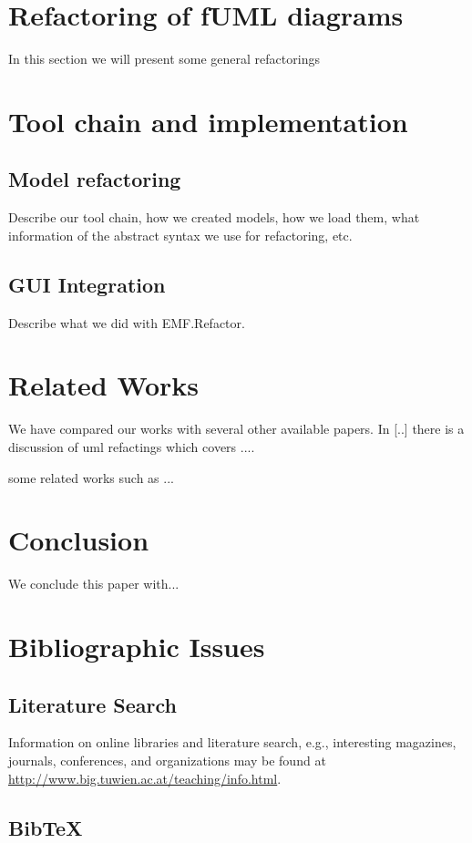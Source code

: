 \documentclass{llncs}
\begin{document}
\section{Refactoring of fUML diagrams}
In this section we will present some general refactorings

\section{Tool chain and implementation}

\subsection{Model refactoring}
Describe our tool chain, how we created models, how we load them, what information of the abstract syntax we use for refactoring, etc.

\subsection{GUI Integration}
Describe what we did with EMF.Refactor.

\section{Related Works}
We have compared our works with several other available papers. In [..] there is a discussion of uml refactings which covers ....

some related works such as ...

\section{Conclusion}
We conclude this paper with...

\section{Bibliographic Issues}

\subsection{Literature Search}

Information on online libraries and literature search, e.g., interesting magazines, journals, conferences, and organizations may be found at \url{http://www.big.tuwien.ac.at/teaching/info.html}.

\subsection{BibTeX}
\end{document}
